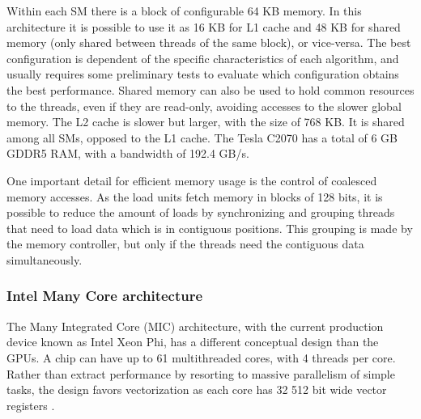 Within each SM there is a block of configurable 64 KB memory. In this architecture it is possible to use it as 16 KB for L1 cache and 48 KB for shared memory (only shared between threads of the same block), or vice-versa. The best configuration is dependent of the specific characteristics of each algorithm, and usually requires some preliminary tests to evaluate which configuration obtains the best performance. Shared memory can also be used to hold common resources to the threads, even if they are read-only, avoiding accesses to the slower global memory. The L2 cache is slower but larger, with the size of 768 KB. It is shared among all SMs, opposed to the L1 cache. The Tesla C2070 has a total of 6 GB GDDR5 RAM, with a bandwidth of 192.4 GB/s.

One important detail for efficient memory usage is the control of coalesced memory accesses. As the load units fetch memory in blocks of 128 bits, it is possible to reduce the amount of loads by synchronizing and grouping threads that need to load data which is in contiguous positions. This grouping is made by the memory controller, but only if the threads need the contiguous data simultaneously.

\subsubsection*{Intel Many Core architecture}
\label{MIC}

The \intel Many Integrated Core (MIC) architecture, with the current production device known as Intel Xeon Phi, has a different conceptual design than the \nvidia GPUs. A chip can have up to 61 multithreaded cores, with 4 threads per core. Rather than extract performance by resorting to massive parallelism of simple tasks, the design favors vectorization as each core has 32 512 bit wide vector registers \cite{Intel:MIC}.

